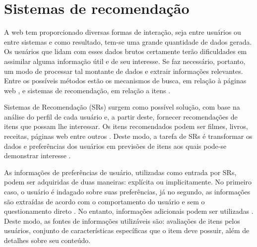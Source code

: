 \chapter{Sistemas de recomendação}
\label{cap:sistemas_de_recomendacao}



A web tem proporcionado diversas formas de interação, seja entre usuários ou entre sistemas e como resultado, tem-se uma grande quantidade de dados gerada. Os usuários que lidam com esses dados brutos certamente terão dificuldades em assimilar alguma informação útil e de seu interesse. Se faz necessário, portanto, um modo de processar tal montante de dados e extrair informações relevantes. Entre os possíveis métodos estão os mecanismos de busca, em relação à páginas web \cite{Brin1998}, e sistemas de recomendação, em relação a itens .


Sistemas de Recomendação (SRs) surgem como possível solução, com base na análise do perfil de cada usuário e, a partir deste, fornecer recomendações de itens que possam lhe interessar. Os itens recomendados podem ser filmes, livros, receitas, páginas web entre outros \cite{Bobadilla_2013}.  Deste modo, a tarefa de SRs é transformar os dados e preferências dos usuários em previsões de itens aos quais pode-se demonstrar interesse \cite{Lue2012}.



As informações de preferências de usuário, utilizadas como entrada por SRs, podem ser adquiridas de duas maneiras: explícita ou implicitamente. No primeiro caso, o usuário é indagado sobre suas preferências, já no segundo, as informações são extraídas de acordo com o comportamento do usuário e sem o questionamento direto \cite{Bobadilla_2013}. No entanto, informações adicionais podem ser utilizadas \cite{Jannach2010}. Deste modo, as fontes de informações utilizáveis são: avaliações de itens pelos usuários, conjunto de características específicas que o item deve possuir, além de detalhes sobre seu conteúdo. 

